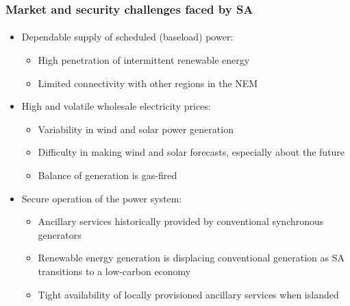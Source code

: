 \documentclass[handout, smaller, xcolor=table]{beamer}			%
\begin{document}
\begin{frame}
	\frametitle{Market and security challenges faced by SA}
	\framesubtitle{}

	\begin{itemize}
		\item  Dependable supply of scheduled (baseload) power:
		\begin{itemize}
			\item  High penetration of intermittent renewable energy
			\item  Limited connectivity with other regions in the NEM
		\end{itemize}
		\item  High and volatile wholesale electricity prices:
		\begin{itemize}
			\item  Variability in wind and solar power generation
			\item  Difficulty in making wind and solar forecasts, especially about the future
			\item  Balance of generation is gas-fired
		\end{itemize}
		\item  Secure operation of the power system:
		\begin{itemize}
			\item  Ancillary services historically provided by conventional synchronous generators
			\item  Renewable energy generation is displacing conventional generation as SA transitions to a low-carbon economy 
			\item  Tight availability of locally provisioned ancillary services when islanded
		\end{itemize}
	\end{itemize}

\end{frame}
\end{document}
